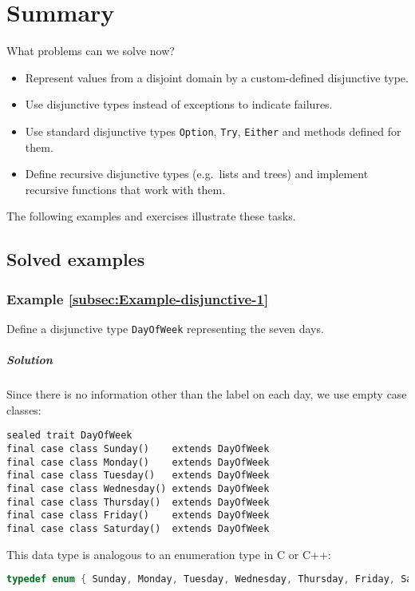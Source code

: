 \section{Summary}

What problems can we solve now?
\begin{itemize}
\item Represent values from a disjoint domain by a custom-defined disjunctive
type.
\item Use disjunctive types instead of exceptions to indicate failures.
\item Use standard disjunctive types \lstinline!Option!, \lstinline!Try!,
\lstinline!Either! and methods defined for them.
\item Define recursive disjunctive types (e.g.~lists and trees) and implement
recursive functions that work with them.
\end{itemize}
The following examples and exercises illustrate these tasks.

\subsection{Solved examples}

\subsubsection{Example \label{subsec:Example-disjunctive-1}\ref{subsec:Example-disjunctive-1}}

Define a disjunctive type \lstinline!DayOfWeek! representing the
seven days.

\subparagraph{Solution}

Since there is no information other than the label on each day, we
use empty case classes:
\begin{lstlisting}
sealed trait DayOfWeek
final case class Sunday()    extends DayOfWeek
final case class Monday()    extends DayOfWeek
final case class Tuesday()   extends DayOfWeek
final case class Wednesday() extends DayOfWeek
final case class Thursday()  extends DayOfWeek
final case class Friday()    extends DayOfWeek
final case class Saturday()  extends DayOfWeek
\end{lstlisting}
This data type is analogous to an enumeration type
in C or C++:
\begin{lstlisting}[language={C++}]
typedef enum { Sunday, Monday, Tuesday, Wednesday, Thursday, Friday, Saturday } DayOfWeek;
\end{lstlisting}


